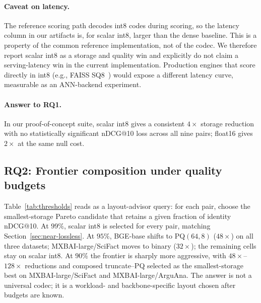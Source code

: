 \documentclass[sigconf]{acmart}
\makeatletter
\newcommand{\ndcg}{nDCG@10}
\makeatother
\begin{document}
\paragraph{Caveat on latency.}
The reference scoring path decodes int8 codes during scoring, so the latency column in our artifacts is, for scalar int8, larger than the dense baseline. This is a property of the common reference implementation, not of the codec. We therefore report scalar int8 as a storage and quality win and explicitly do not claim a serving-latency win in the current implementation. Production engines that score directly in int8 (e.g., FAISS SQ8~\cite{douze2024faiss}) would expose a different latency curve, measurable as an ANN-backend experiment.

\paragraph{Answer to RQ1.}
In our proof-of-concept suite, scalar int8 gives a consistent $4\times$ storage reduction with no statistically significant \ndcg{} loss across all nine pairs; float16 gives $2\times$ at the same null cost.

\subsection{RQ2: Frontier composition under quality budgets}
\label{sec:budgets}

Table~\ref{tab:thresholds} reads as a layout-advisor query: for each pair, choose the smallest-storage Pareto candidate that retains a given fraction of identity \ndcg{}. At $99\%$, scalar int8 is selected for every pair, matching Section~\ref{sec:near-lossless}. At $95\%$, BGE-base shifts to PQ$(64,8)$ ($48\times$) on all three datasets; MXBAI-large/SciFact moves to binary ($32\times$); the remaining cells stay on scalar int8. At $90\%$ the frontier is sharply more aggressive, with $48\times$--$128\times$ reductions and composed truncate--PQ selected as the smallest-storage best on MXBAI-large/SciFact and MXBAI-large/ArguAna. The answer is not a universal codec; it is a workload- and backbone-specific layout chosen after budgets are known.
\end{document}
